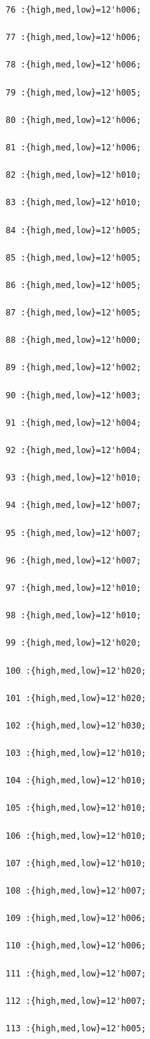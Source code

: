 \documentclass[UTF8]{ctexart}
\begin{document}
\begin{verbatim}
76 :{high,med,low}=12'h006;

77 :{high,med,low}=12'h006;

78 :{high,med,low}=12'h006;

79 :{high,med,low}=12'h005;

80 :{high,med,low}=12'h006;

81 :{high,med,low}=12'h006;

82 :{high,med,low}=12'h010;

83 :{high,med,low}=12'h010;

84 :{high,med,low}=12'h005;

85 :{high,med,low}=12'h005;

86 :{high,med,low}=12'h005;

87 :{high,med,low}=12'h005;

88 :{high,med,low}=12'h000;

89 :{high,med,low}=12'h002;

90 :{high,med,low}=12'h003;

91 :{high,med,low}=12'h004;

92 :{high,med,low}=12'h004;

93 :{high,med,low}=12'h010;

94 :{high,med,low}=12'h007;

95 :{high,med,low}=12'h007;

96 :{high,med,low}=12'h007;

97 :{high,med,low}=12'h010;

98 :{high,med,low}=12'h010;

99 :{high,med,low}=12'h020;

100 :{high,med,low}=12'h020;

101 :{high,med,low}=12'h020;

102 :{high,med,low}=12'h030;

103 :{high,med,low}=12'h010;

104 :{high,med,low}=12'h010;

105 :{high,med,low}=12'h010;

106 :{high,med,low}=12'h010;

107 :{high,med,low}=12'h010;

108 :{high,med,low}=12'h007;

109 :{high,med,low}=12'h006;

110 :{high,med,low}=12'h006;

111 :{high,med,low}=12'h007;

112 :{high,med,low}=12'h007;

113 :{high,med,low}=12'h005;


\end{verbatim}
\end{document}
